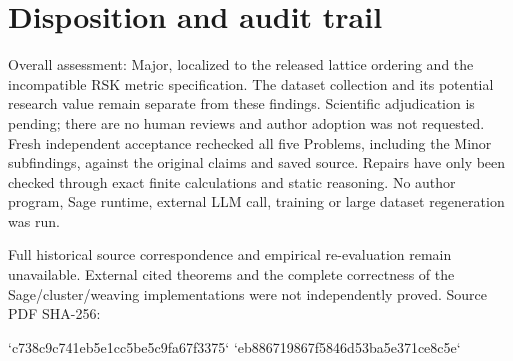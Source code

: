 \documentclass[10pt]{article}
\begin{document}
\section*{Disposition and audit trail}
Overall assessment: Major, localized to the released lattice ordering and the incompatible RSK metric specification. The dataset collection and its potential research value remain separate from these findings. Scientific adjudication is pending; there are no human reviews and author adoption was not requested. Fresh independent acceptance rechecked all five Problems, including the Minor subfindings, against the original claims and saved source. Repairs have only been checked through exact finite calculations and static reasoning. No author program, Sage runtime, external LLM call, training or large dataset regeneration was run.\par
Full historical source correspondence and empirical re-evaluation remain unavailable. External cited theorems and the complete correctness of the Sage/cluster/weaving implementations were not independently proved. Source PDF SHA-256:\par
`c738c9c741eb5e1cc5be5c9fa67f3375`
`eb886719867f5846d53ba5e371ce8c5e`\par
\end{document}
